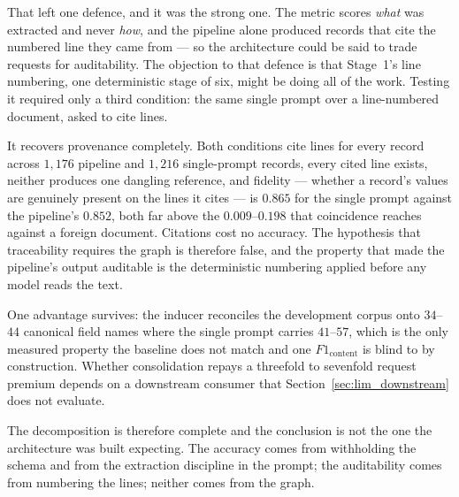 \documentclass[11pt]{article}
\begin{document}
That left one defence, and it was the strong one. The metric scores \emph{what}
was extracted and never \emph{how}, and the pipeline alone produced records that
cite the numbered line they came from --- so the architecture could be said to
trade requests for auditability. The objection to that defence is that Stage~1's
line numbering, one deterministic stage of six, might be doing all of the work.
Testing it required only a third condition: the same single prompt over a
line-numbered document, asked to cite lines.

It recovers provenance completely. Both conditions cite lines for every record
across $1{,}176$ pipeline and $1{,}216$ single-prompt records, every cited line
exists, neither produces one dangling reference, and fidelity --- whether a
record's values are genuinely present on the lines it cites --- is $0.865$ for
the single prompt against the pipeline's $0.852$, both far above the
$0.009$--$0.198$ that coincidence reaches against a foreign document. Citations
cost no accuracy. The hypothesis that traceability requires the graph is
therefore false, and the property that made the pipeline's output auditable is
the deterministic numbering applied before any model reads the text.

One advantage survives: the inducer reconciles the development corpus onto
$34$--$44$ canonical field names where the single prompt carries $41$--$57$,
which is the only measured property the baseline does not match and one
$F1_{\text{content}}$ is blind to by construction. Whether consolidation repays
a threefold to sevenfold request premium depends on a downstream consumer that
Section~\ref{sec:lim_downstream} does not evaluate.

The decomposition is therefore complete and the conclusion is not the one the
architecture was built expecting. The accuracy comes from withholding the schema
and from the extraction discipline in the prompt; the auditability comes from
numbering the lines; neither comes from the graph.
\end{document}
